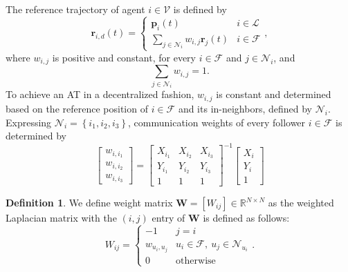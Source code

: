 \documentclass[journal]{IEEEtran}
\theoremstyle{definition}
\newtheorem{definition}{Definition}
\theoremstyle{plain}
\begin{document}
The reference trajectory of agent $i\in \mathcal{V}$ is defined by
\begin{equation}\label{desiredtraject}
\mathbf{r}_{i,d}(t)=\begin{cases}
\mathbf{p}_i(t)&i\in \mathcal{L}\\
\sum_{j\in \mathcal{N}_i}w_{i,j}\mathbf{r}_j(t)&i\in \mathcal{F}
\end{cases}
,
\end{equation}
where $w_{i,j}$ is positive and constant, for every $i\in \mathcal{F}$ and $j\in \mathcal{N}_i$, and
\begin{equation}
    \sum_{j\in \mathcal{N}_i}w_{i,j}=1.
\end{equation}
To achieve an AT in a decentralized fashion, $w_{i,j}$ is constant and determined based on the reference position of $i\in \mathcal{F}$ and its in-neighbors, defined by $\mathcal{N}_i$. Expressing $\mathcal{N}_i=\left\{i_1,i_2,i_3\right\}$, communication weights of every follower $i\in \mathcal{F}$ is determined by
    \begin{equation}\label{folcomweights}
        \begin{bmatrix}
            w_{i,i_1}\\
            w_{i,i_2}\\
            w_{i,i_3}
        \end{bmatrix}
        =\begin{bmatrix}
        X_{i_1}&X_{i_2}&X_{i_3}\\
        Y_{i_1}&Y_{i_2}&Y_{i_3}\\
        1&1&1
        \end{bmatrix}
        ^{-1}
        \begin{bmatrix}
        X_i\\
        Y_i\\
        1
        \end{bmatrix}
    \end{equation}     
\begin{definition}
    We define weight matrix $\mathbf{W}=\left[W_{ij}\right]\in \mathbb{R}^{N\times N}$ as the weighted Laplacian matrix with the $(i,j)$ entry of $\mathbf{W}$ is defined as follows:
    \begin{equation}
    W_{ij}=\begin{cases}
        -1&j=i\\
        w_{u_i,u_j}&u_i\in \mathcal{F},~u_j\in \mathcal{N}_{u_i}\\
        0&\mathrm{otherwise}
    \end{cases}
    .
    \end{equation}
\end{definition}
\end{document}
